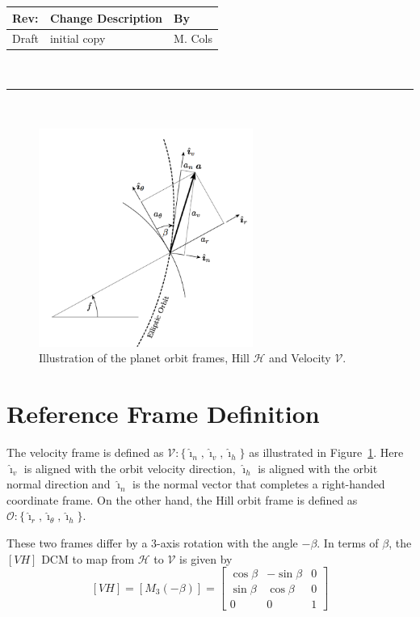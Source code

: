 \documentclass[]{AVSSimReportMemo}
\begin{document}
\makeCover


%
%
\pagestyle{empty}
{\renewcommand{\arraystretch}{2}
\noindent
\begin{longtable}{|p{0.5in}|p{4.5in}|p{1.14in}|}
\hline
{\bfseries Rev}: & {\bfseries Change Description} & {\bfseries By} \\
\hline
Draft & initial copy & M. Cols \\
\hline

\end{longtable}
}

\newpage
\setcounter{page}{1}
\pagestyle{fancy}

\tableofcontents
~\\ \hrule ~\\

\begin{figure}[htb]
  \centerline{
  \includegraphics[width=7cm]{Figures/velocityPoint}
  }
  \caption{Illustration of the planet orbit frames, Hill $\mathcal{H}$ and Velocity $\mathcal{V}$.}
  \label{fig:Fig1}
\end{figure}

\section{Reference Frame Definition}
The velocity frame is defined as $\mathcal{V}:\{ \hat{\bm\imath}_{n}, \hat{\bm\imath}_{v}, \hat{\bm\imath}_{h} \}$ as illustrated in Figure~\ref{fig:Fig1}.  Here $\hat{\bm\imath}_{v}$ is aligned with the orbit velocity direction, $\hat{\bm\imath}_{h}$ is aligned with the orbit normal direction and $\hat{\bm\imath}_{n}$ is the normal vector that completes a right-handed coordinate frame.  On the other hand, the  Hill orbit frame is defined as $\mathcal{O}:\{\hat{\bm\imath}_{r}, \hat{\bm\imath}_{\theta}, \hat{\bm \imath}_{h}  \}$.\par  
These two frames differ by a 3-axis rotation with the angle $-\beta$.  In terms of $\beta$, the $[VH]$ DCM to map from $\mathcal{H}$ to $\mathcal{V}$ is given by
\begin{equation}
  \label{eq:VHbeta}
  [VH] = [M_{3}(-\beta)] = \begin{bmatrix}
    \cos\beta & -\sin\beta & 0 \\
    \sin\beta & \cos\beta &0 \\
    0 & 0 & 1
  \end{bmatrix}
\end{equation}
\end{document}
